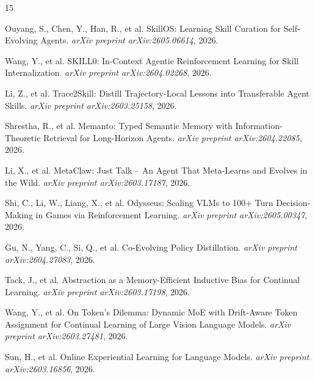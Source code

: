 \documentclass[11pt]{article}
\begin{document}
\begin{thebibliography}{15}

Ouyang, S., Chen, Y., Han, R., et al.
\newblock SkillOS: Learning Skill Curation for Self-Evolving Agents.
\newblock \emph{arXiv preprint arXiv:2605.06614}, 2026.

Wang, Y., et al.
\newblock SKILL0: In-Context Agentic Reinforcement Learning for Skill Internalization.
\newblock \emph{arXiv preprint arXiv:2604.02268}, 2026.

Li, Z., et al.
\newblock Trace2Skill: Distill Trajectory-Local Lessons into Transferable Agent Skills.
\newblock \emph{arXiv preprint arXiv:2603.25158}, 2026.

Shrestha, R., et al.
\newblock Memanto: Typed Semantic Memory with Information-Theoretic Retrieval for Long-Horizon Agents.
\newblock \emph{arXiv preprint arXiv:2604.22085}, 2026.

Li, X., et al.
\newblock MetaClaw: Just Talk -- An Agent That Meta-Learns and Evolves in the Wild.
\newblock \emph{arXiv preprint arXiv:2603.17187}, 2026.

Shi, C., Li, W., Liang, X., et al.
\newblock Odysseus: Scaling VLMs to 100+ Turn Decision-Making in Games via Reinforcement Learning.
\newblock \emph{arXiv preprint arXiv:2605.00347}, 2026.

Gu, N., Yang, C., Si, Q., et al.
\newblock Co-Evolving Policy Distillation.
\newblock \emph{arXiv preprint arXiv:2604.27083}, 2026.

Tack, J., et al.
\newblock Abstraction as a Memory-Efficient Inductive Bias for Continual Learning.
\newblock \emph{arXiv preprint arXiv:2603.17198}, 2026.

Wang, Y., et al.
\newblock On Token's Dilemma: Dynamic MoE with Drift-Aware Token Assignment for Continual Learning of Large Vision Language Models.
\newblock \emph{arXiv preprint arXiv:2603.27481}, 2026.

Sun, H., et al.
\newblock Online Experiential Learning for Language Models.
\newblock \emph{arXiv preprint arXiv:2603.16856}, 2026.

\end{thebibliography}
\end{document}
